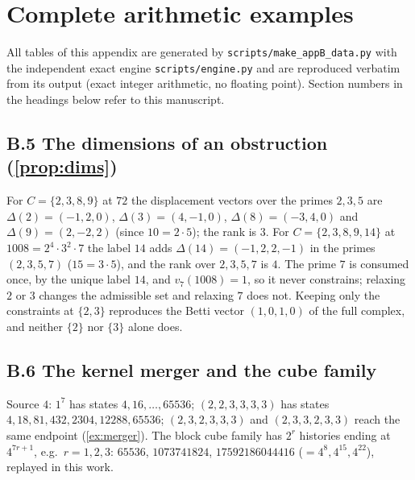 \section{Complete arithmetic examples}\label{app:examples}
All tables of this appendix are generated by \texttt{scripts/make\_appB\_data.py} with the independent exact engine \texttt{scripts/engine.py} and are reproduced verbatim from its output (exact integer arithmetic, no floating point). Section numbers in the headings below refer to this manuscript.

\subsection*{B.5 The dimensions of an obstruction (\cref{prop:dims})}
For $C=\{2,3,8,9\}$ at $72$ the displacement vectors over the primes $2,3,5$ are $\Delta(2)=(-1,2,0)$, $\Delta(3)=(4,-1,0)$, $\Delta(8)=(-3,4,0)$ and $\Delta(9)=(2,-2,2)$ (since $10=2\cdot5$); the rank is $3$. For $C=\{2,3,8,9,14\}$ at $1008=2^4\cdot3^2\cdot7$ the label $14$ adds $\Delta(14)=(-1,2,2,-1)$ in the primes $(2,3,5,7)$ ($15=3\cdot5$), and the rank over $2,3,5,7$ is $4$. The prime $7$ is consumed once, by the unique label $14$, and $v_7(1008)=1$, so it never constrains; relaxing $2$ or $3$ changes the admissible set and relaxing $7$ does not. Keeping only the constraints at $\{2,3\}$ reproduces the Betti vector $(1,0,1,0)$ of the full complex, and neither $\{2\}$ nor $\{3\}$ alone does.
\subsection*{B.6 The kernel merger and the cube family}
Source $4$: $1^7$ has states $4,16,\dots,65536$; $(2,2,3,3,3,3)$ has states $4,18,81,432,2304,12288,65536$; $(2,3,2,3,3,3)$ and $(2,3,3,2,3,3)$ reach the same endpoint (\cref{ex:merger}). The block cube family has $2^r$ histories ending at $4^{7r+1}$, e.g.\ $r=1,2,3$: $65536$, $1073741824$, $17592186044416$ ($=4^8,4^{15},4^{22}$), replayed in this work.

